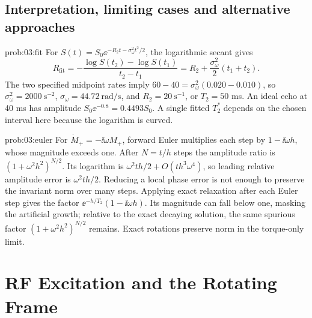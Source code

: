 \subsection{Interpretation, limiting cases and alternative approaches}
\begin{solution}{prob:03:fit}
For \(S(t)=S_0\ee^{-R_2t-\sigma_\omega^2t^2/2}\), the logarithmic secant gives
\[
 R_{\mathrm{fit}}=-\frac{\log S(t_2)-\log S(t_1)}{t_2-t_1}
 =R_2+\frac{\sigma_\omega^2}{2}(t_1+t_2).
\]
The two specified midpoint rates imply
\(60-40=\sigma_\omega^2(0.020-0.010)\), so
\(\sigma_\omega^2=2000\ \mathrm{s}^{-2}\),
\(\sigma_\omega=44.72\ \mathrm{rad/s}\), and
\(R_2=20\ \mathrm{s}^{-1}\), or \(T_2=50\) ms.
An ideal echo at 40 ms has amplitude \(S_0\ee^{-0.8}=0.4493S_0\).
A single fitted \(T_2^*\) depends on the chosen interval here because the logarithm is curved.
\end{solution}
\begin{solution}{prob:03:euler}
For \(\dot M_+=-\ii\omega M_+\), forward Euler multiplies each step by
\(1-\ii\omega h\), whose magnitude exceeds one.
After \(N=t/h\) steps the amplitude ratio is
\((1+\omega^2h^2)^{N/2}\).
Its logarithm is \(\omega^2th/2+O(th^3\omega^4)\), so leading relative amplitude error is \(\omega^2th/2\).
Reducing a local phase error is not enough to preserve the invariant norm over many steps.
Applying exact relaxation after each Euler step gives the factor \(\ee^{-h/T_2}(1-\ii\omega h)\). Its magnitude can fall below one, masking the artificial growth; relative to the exact decaying solution, the same spurious factor \((1+\omega^2h^2)^{N/2}\) remains. Exact rotations preserve norm in the torque-only limit.
\end{solution}

\section{RF Excitation and the Rotating Frame}
\label{sec:e:rf-excitation-and-the-rotating-frame}
